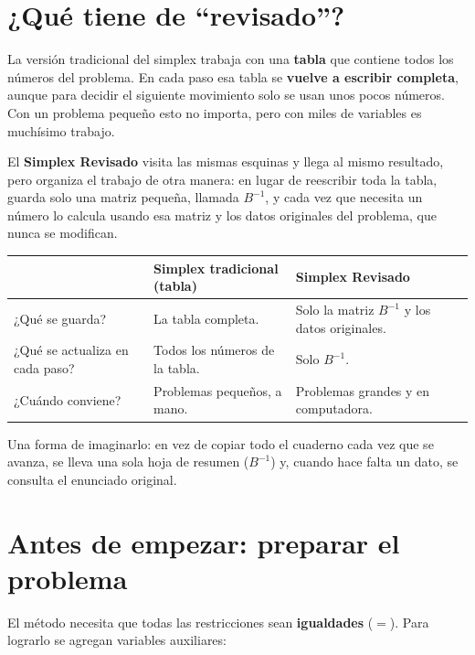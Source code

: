 \documentclass[11pt,a4paper]{article}
\newcommand{\Binv}{B^{-1}}
\begin{document}
\section{¿Qué tiene de ``revisado''?}

La versión tradicional del simplex trabaja con una \textbf{tabla} que contiene todos los números del problema.
En cada paso esa tabla se \textbf{vuelve a escribir completa}, aunque para decidir el siguiente movimiento solo se
usan unos pocos números. Con un problema pequeño esto no importa, pero con miles de variables es muchísimo trabajo.

El \textbf{Simplex Revisado} visita las mismas esquinas y llega al mismo resultado, pero organiza el trabajo de
otra manera: en lugar de reescribir toda la tabla, guarda solo una matriz pequeña, llamada $\Binv$, y cada vez
que necesita un número lo calcula usando esa matriz y los datos originales del problema, que nunca se modifican.

\begin{center}\small
\begin{tabular}{p{3.6cm}p{5.2cm}p{5.4cm}}
\toprule
 & \textbf{Simplex tradicional (tabla)} & \textbf{Simplex Revisado} \\
\midrule
¿Qué se guarda? & La tabla completa. & Solo la matriz $\Binv$ y los datos originales. \\
¿Qué se actualiza en cada paso? & Todos los números de la tabla. & Solo $\Binv$. \\
¿Cuándo conviene? & Problemas pequeños, a mano. & Problemas grandes y en computadora. \\
\bottomrule
\end{tabular}
\end{center}

Una forma de imaginarlo: en vez de copiar todo el cuaderno cada vez que se avanza, se lleva una sola hoja
de resumen ($\Binv$) y, cuando hace falta un dato, se consulta el enunciado original.

\section{Antes de empezar: preparar el problema}

El método necesita que todas las restricciones sean \textbf{igualdades} ($=$). Para lograrlo se agregan
variables auxiliares:
\end{document}
